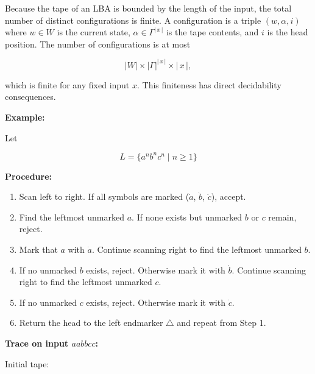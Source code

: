 \documentclass[12pt,a4paper,openany]{article}
\begin{document}
Because the tape of an LBA is bounded by the length of the input, the total number of
distinct configurations is finite. A configuration is a triple $(w, \alpha, i)$ where
$w \in W$ is the current state, $\alpha \in \Gamma^{|\,x\,|}$ is the tape contents, and
$i$ is the head position. The number of configurations is at most

\[
|W| \times |\Gamma|^{|\,x\,|} \times |\,x\,|,
\]

which is finite for any fixed input $x$. This finiteness has direct decidability consequences.


\textbf{Example:}

Let

\[
L = \{a^n b^n c^n \mid n \geq 1\}
\]

\noindent\textbf{Procedure:}

\begin{enumerate}

  \item Scan left to right. If all symbols are marked ($\dot{a}$, $\dot{b}$, $\dot{c}$),
    accept.

  \item Find the leftmost unmarked $a$. If none exists but unmarked $b$ or $c$ remain,
    reject.

  \item Mark that $a$ with $\dot{a}$. Continue scanning right to find the leftmost
    unmarked $b$.

  \item If no unmarked $b$ exists, reject. Otherwise mark it with $\dot{b}$.
    Continue scanning right to find the leftmost unmarked $c$.

  \item If no unmarked $c$ exists, reject. Otherwise mark it with $\dot{c}$.

  \item Return the head to the left endmarker $\triangle$ and repeat from Step 1.

\end{enumerate}


\noindent\textbf{Trace on input $aabbcc$:}

Initial tape:

\begin{center}
\end{center}
\end{document}
